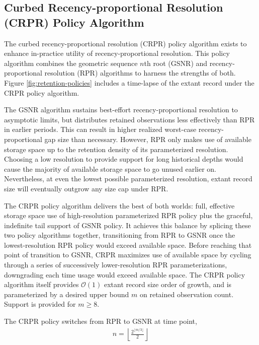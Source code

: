 \subsection{Curbed Recency-proportional Resolution (CRPR) Policy Algorithm}
\label{sec:curbed-recency-proportional-resolution-algo}

The curbed recency-proportional resolution (CRPR) policy algorithm exists to enhance in-practice utility of recency-proportional resolution.
This policy algorithm combines the geometric sequence $n$th root (GSNR) and recency-proportional resolution (RPR) algorithms to harness the strengths of both.
Figure \ref{fig:retention-policies} includes a time-lapse of the extant record under the CRPR policy algorithm.

The GSNR algorithm sustains best-effort recency-proportional resolution to asymptotic limits, but distributes retained observations less effectively than RPR in earlier periods.
This can result in higher realized worst-case recency-proportional gap size than necessary.
However, RPR only makes use of available storage space up to the retention density of its parameterized resolution.
Choosing a low resolution to provide support for long historical depths would cause the majority of available storage space to go unused earlier on.
Nevertheless, at even the lowest possible parameterized resolution, extant record size will eventually outgrow any size cap under RPR.

The CRPR policy algorithm delivers the best of both worlds: full, effective storage space use of high-resolution parameterized RPR policy plus the graceful, indefinite tail support of GSNR policy.
It achieves this balance by splicing these two policy algorithms together, transitioning from RPR to GSNR once the lowest-resolution RPR policy would exceed available space.
Before reaching that point of transition to GSNR, CRPR maximizes use of available space by cycling through a series of successively lower-resolution RPR parameterizations, downgrading each time usage would exceed available space.
The CRPR policy algorithm itself provides $\mathcal{O}(1)$ extant record size order of growth, and is parameterized by a desired upper bound $m$ on retained observation count.
Support is provided for $m \geq 8$.

The CRPR policy switches from RPR to GSNR at time point,
\begin{align*}
n = \left\lfloor \frac{2^{\lfloor m/3 \rfloor}}{2} \right\rfloor
\end{align*}

